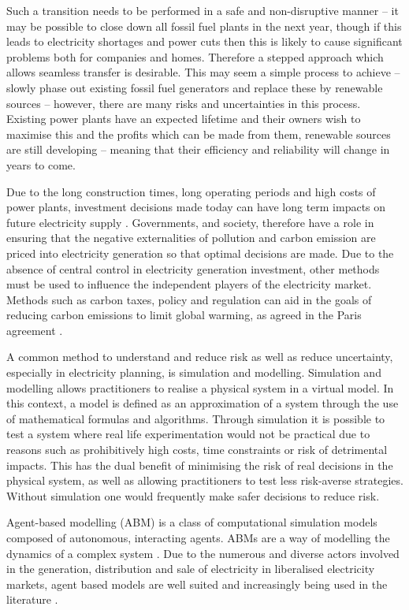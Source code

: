 Such a transition needs to be performed in a safe and non-disruptive manner -- it may be possible to close down all fossil fuel plants in the next year, though if this leads to electricity shortages and power cuts then this is likely to cause significant problems both for companies and homes. Therefore a stepped approach which allows seamless transfer is desirable. This may seem a simple process to achieve -- slowly phase out existing fossil fuel generators and replace these by renewable sources -- however, there are many risks and uncertainties in this process. Existing power plants have an expected lifetime and their owners wish to maximise this and the profits which can be made from them, renewable sources are still developing -- meaning that their efficiency and reliability will change in years to come.

Due to the long construction times, long operating periods and high costs of power plants, investment decisions made today can have long term impacts on future electricity supply \cite{Chappin2017}. Governments, and society, therefore have a role in ensuring that the negative externalities of pollution and carbon emission are priced into electricity generation so that optimal decisions are made. Due to the absence of central control in electricity generation investment, other methods must be used to influence the independent players of the electricity market. Methods such as carbon taxes, policy and regulation can aid in the goals of reducing carbon emissions to limit global warming, as agreed in the Paris agreement \cite{May2002}.

A common method to understand and reduce risk as well as reduce uncertainty, especially in electricity planning, is simulation and modelling. Simulation and modelling allows practitioners to realise a physical system in a virtual model. In this context, a model is defined as an approximation of a system through the use of mathematical formulas and algorithms. Through simulation it is possible to test a system where real life experimentation would not be practical due to reasons such as prohibitively high costs, time constraints or risk of detrimental impacts. This has the dual benefit of minimising the risk of real decisions in the physical system, as well as allowing practitioners to test less risk-averse strategies. Without simulation one would frequently make safer decisions to reduce risk.

Agent-based modelling (ABM) is a class of computational simulation models composed of autonomous, interacting agents. ABMs are a way of modelling the dynamics of a complex system \cite{MacAl2010}. Due to the numerous and diverse actors involved in the generation, distribution and sale of electricity in liberalised electricity markets, agent based models are well suited and increasingly being used in the literature \cite{Zhou2007}.


